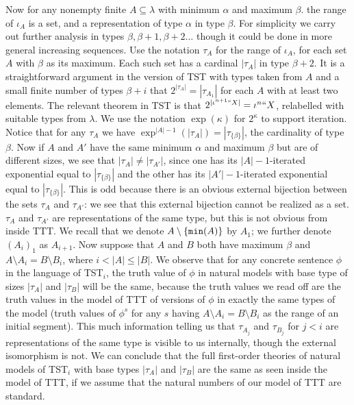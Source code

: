 \documentclass[112pt]{article}
\begin{document}
Now for any nonempty finite $A \subseteq \lambda$ with minimum $\alpha$ and maximum $\beta$. the range of $\iota_A$ is a set, and a representation of type $\alpha$ in
type $\beta$.  For simplicity we carry out further analysis in types $\beta, \beta+1,\beta+2\ldots$ though it could be done in more general increasing sequences.  Use the notation
$\tau_A$ for the range of $\iota_A$, for each set $A$ with $\beta$ as its maximum.  Each such set has a cardinal $|\tau_A|$ in type $\beta+2$.  It is a straightforward
argument in the version of TST with types taken from $A$ and a small finite number of types $\beta+i$ that $2^{|\tau_A|} = |\tau_{A_1}|$ for each $A$ with at least two elements.
The relevant theorem in TST is that $2^{|\iota^{n+1}``X|} = \iota^n``X$, relabelled with suitable types from $\lambda$.   We use the notation $\exp(\kappa)$ for $2^\kappa$ to support iteration.  Notice that for any $\tau_A$ we have $\exp^{|A|-1}(|\tau_A|) = |\tau_{\{\beta\}}|$, the cardinality of type $\beta$.  Now if $A$ and $A'$ have the same minimum $\alpha$ and maximum $\beta$ 
but are of different sizes, we see that $|\tau_A| \neq |\tau_{A'}|$, since one has its $|A|-1$-iterated exponential equal to $|\tau_{\{\beta\}}|$ and the other has its $|A'|-1$-iterated exponential equal to $|\tau_{\{\beta\}}|$.  This is odd because there is an obvious external bijection between the sets $\tau_A$ and $\tau_{A'}$:  we see that this external bijection cannot be realized as a set.  $\tau_A$ and $\tau_{A'}$ are representations of the same type, but this is not obvious from inside TTT.  We recall that we denote $A \setminus \{{\tt min}(A)\}$ by $A_1$;  we further denote $(A_i)_1$ as $A_{i+1}$.  Now suppose that $A$ and $B$ both have maximum $\beta$ and $A \setminus A_i = B \setminus B_i$, where $i<|A| \leq |B|$.
We observe that for any concrete sentence $\phi$  in the language of TST$_i$, the truth value of $\phi$ in natural models with base type of sizes $|\tau_A|$ and $|\tau_B|$ will be the same, because the truth values we read off are the truth values in the model of TTT of versions of $\phi$ in exactly the same types of the model (truth values of $\phi^s$ for
any $s$ having $A \setminus A_i = B\setminus B_i$ as the range of an initial segment).  This much information telling us that $\tau_{A_j}$ and $\tau_{B_j}$ for $j<i$ are representations of the same type  is visible to us internally, though the external isomorphism is not.  We can conclude that the full first-order theories of natural models of TST$_i$ with base types $|\tau_A|$ and $|\tau_B|$ are
the same as seen inside the model of TTT, if we assume that the natural numbers of our model of TTT are standard.
\end{document}
